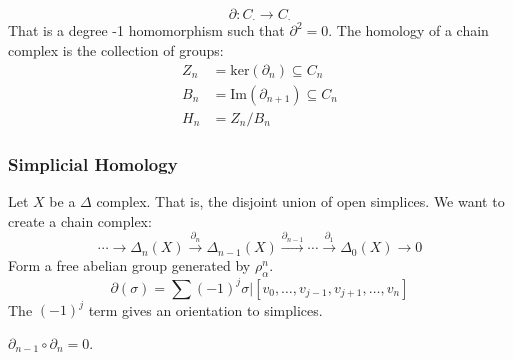 \documentclass[crop=false,class=book,oneside]{standalone}
\begin{document}
                \begin{equation}
                    \partial:C_{\cdot}\rightarrow{C}_{\cdot}
                \end{equation}
                That is a degree -1 homomorphism such that
                $\partial^{2}=0$. The homology of a chain
                complex is the collection of groups:
                \begin{align}
                    Z_{n}&=\mathrm{ker}(\partial_{n})
                        \subseteq{C}_{n}\\
                    B_{n}&=\mathrm{Im}(\partial_{n+1})
                        \subseteq{C}_{n}\\
                    H_{n}&=Z_{n}/B_{n}
                \end{align}
            \subsubsection{Simplicial Homology}
                Let $X$ be a $\Delta$ complex. That is, the
                disjoint union of open simplices. We want to create
                a chain complex:
                \begin{equation}
                    \cdots\longrightarrow\Delta_{n}(X)
                    \overset{\partial_{n}}{\longrightarrow}
                    \Delta_{n-1}(X)
                    \overset{\partial_{n-1}}{\longrightarrow}
                    \cdots
                    \overset{\partial_{1}}{\longrightarrow}
                    \Delta_{0}(X)
                    \longrightarrow{0}
                \end{equation}
                Form a free abelian group generated by
                $\rho_{\alpha}^{n}$.
                \begin{equation}
                    \partial(\sigma)=
                    \sum(\minus{1})^{j}\sigma|
                    [v_{0},\dots,v_{j-1},v_{j+1},\dots,v_{n}]
                \end{equation}
                The $(\minus{1})^{j}$ term gives an orientation
                to simplices.
                \begin{theorem}
                    $\partial_{n-1}\circ\partial_{n}=0$.
                \end{theorem}
\end{document}
